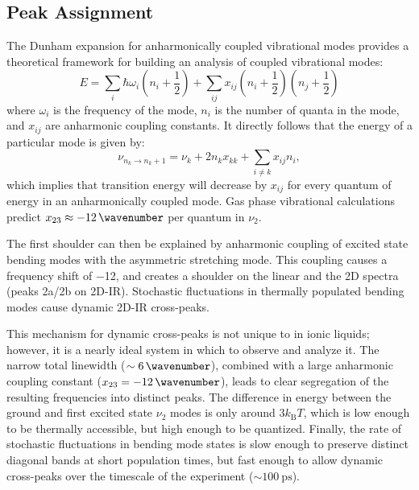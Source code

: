 \documentclass[%
  class = book,%
  crop = false,%
  float = true,%
  multi = true,%
  preview = false,%
]{standalone}
\begin{document}
{\subsection{Peak Assignment}
\label{sec:nu3_assignment}
The Dunham expansion for anharmonically coupled vibrational modes provides a theoretical framework for building an analysis of coupled vibrational modes:
\begin{equation}
  \label{eq:Dunham expansion}
  E = \sum_{i} \hbar \omega_i \left( n_i + \frac{1}{2} \right) + \sum_{ij} x_{ij} \left( n_i + \frac{1}{2} \right) \left( n_j + \frac{1}{2} \right)
\end{equation}
where \(\omega_{i}\) is the frequency of the mode, \(n_{i}\) is the number of quanta in the mode, and \(x_{ij}\) are anharmonic coupling constants. It directly follows that the energy of a particular mode is given by:
\begin{equation}
  \label{eq:anh_coupled_energy}
  \nu_{n_k \rightarrow n_k + 1} = \nu_k + 2n_{k}x_{kk} + \sum_{i \neq k} x_{ij}n_{i},
\end{equation}
which implies that transition energy will decrease by \(x_{ij}\) for every quantum of energy in an anharmonically coupled mode.\cite{Botan2008} Gas phase vibrational calculations predict \(x_{23} \approx \SI{-12}{\wavenumber}\) per quantum in \(\nu_2\).\cite{Taylor1993,Dressier1997}

The first shoulder can then be explained by anharmonic coupling of excited state bending modes with the asymmetric stretching mode. This coupling causes a frequency shift of \SI{-12}{\wavenumber}, and creates a shoulder on the linear and the 2D spectra (peaks 2a/2b on 2D-IR). Stochastic fluctuations in thermally populated bending modes cause dynamic 2D-IR cross-peaks.

This mechanism for dynamic cross-peaks is not unique to  in ionic liquids; however, it is a nearly ideal system in which to observe and analyze it. The narrow total linewidth (\(\sim \SI{6}{\wavenumber}\)), combined with a large anharmonic coupling constant (\(x_{23} = \SI{-12}{\wavenumber}\)), leads to clear segregation of the resulting frequencies into distinct peaks. The difference in energy between the ground and first excited state \(\nu_2\) modes is only around \(3k_{\mathrm{B}}T\), which is low enough to be thermally accessible, but high enough to be quantized. Finally, the rate of stochastic fluctuations in bending mode states is slow enough to preserve distinct diagonal bands at short population times, but fast enough to allow dynamic cross-peaks over the timescale of the experiment (\(\sim \SI{100}{\ps}\)).

}
\end{document}
